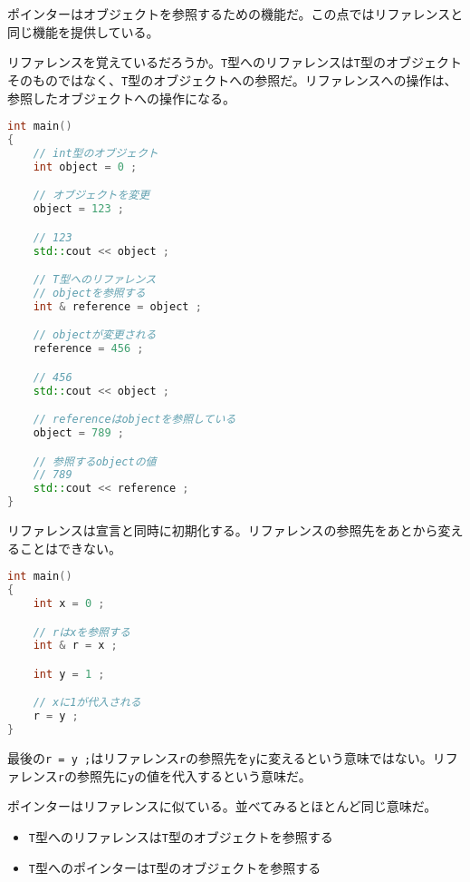 

ポインターはオブジェクトを参照するための機能だ。この点ではリファレンスと同じ機能を提供している。

リファレンスを覚えているだろうか。\texttt{T}型へのリファレンスは\texttt{T}型のオブジェクトそのものではなく、\texttt{T}型のオブジェクトへの参照だ。リファレンスへの操作は、参照したオブジェクトへの操作になる。

\begin{lstlisting}[language={C++}]
int main()
{
    // int型のオブジェクト
    int object = 0 ;

    // オブジェクトを変更
    object = 123 ;

    // 123
    std::cout << object ;

    // T型へのリファレンス
    // objectを参照する
    int & reference = object ;

    // objectが変更される
    reference = 456 ;

    // 456
    std::cout << object ;

    // referenceはobjectを参照している
    object = 789 ;

    // 参照するobjectの値
    // 789
    std::cout << reference ;
}
\end{lstlisting}

リファレンスは宣言と同時に初期化する。リファレンスの参照先をあとから変えることはできない。

\begin{lstlisting}[language={C++}]
int main()
{
    int x = 0 ;

    // rはxを参照する
    int & r = x ;

    int y = 1 ;

    // xに1が代入される
    r = y ;
}
\end{lstlisting}

最後の\texttt{r = y ;}はリファレンス\texttt{r}の参照先を\texttt{y}に変えるという意味ではない。リファレンス\texttt{r}の参照先に\texttt{y}の値を代入するという意味だ。

ポインターはリファレンスに似ている。並べてみるとほとんど同じ意味だ。

\begin{itemize}
\item
  \texttt{T}型へのリファレンスは\texttt{T}型のオブジェクトを参照する
\item
  \texttt{T}型へのポインターは\texttt{T}型のオブジェクトを参照する
\end{itemize}

